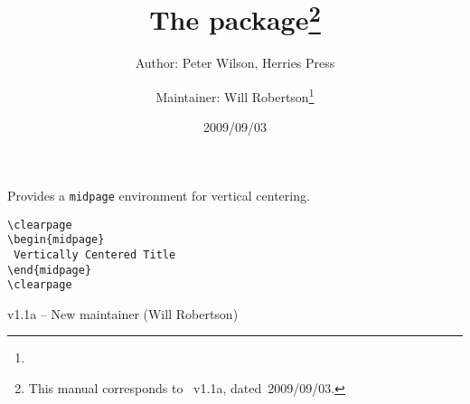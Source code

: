 \documentclass[fontsize=14pt, DIV=9, parskip=half, pagesize=auto]{scrartcl}
\title{The \pkg{midpage} package\thanks{This manual corresponds to \pkg{midpage}~v1.1a, dated~2009/09/03.}}
\author{Author: Peter Wilson, Herries Press\and Maintainer: Will Robertson\thanks{\mail{will.robertson@latex-project.org}}}
\date{2009/09/03}
\newcommand*{\env}[1]{\texttt{#1}}
\begin{document}
\maketitle

Provides a \env{midpage} environment for vertical centering.



\begin{verbatim}
\clearpage
\begin{midpage}
 Vertically Centered Title
\end{midpage}
\clearpage
\end{verbatim}



v1.1a -- New maintainer (Will Robertson)
\end{document}

